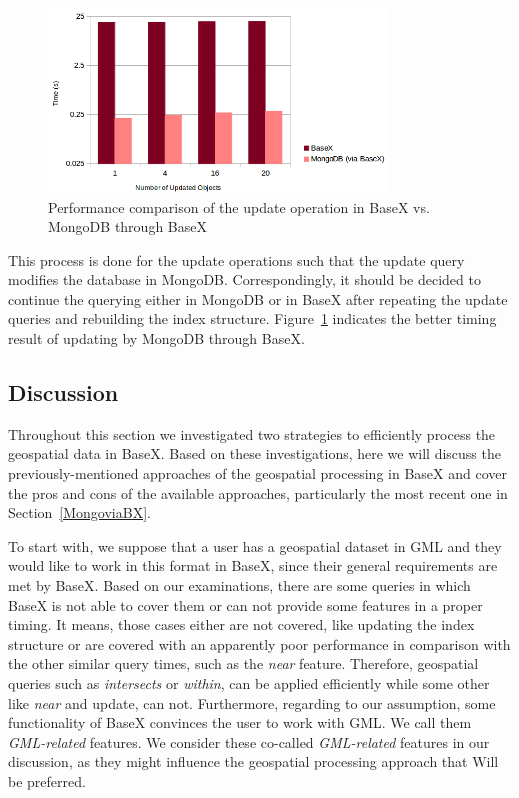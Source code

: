 \documentclass[a4paper,12pt]{article}
\begin{document}
\begin{figure}
\centering
\includegraphics[width=0.8\textwidth]{MongoviaBX-Update-sec-log.png}
\caption{Performance comparison of the update operation in BaseX vs. MongoDB through BaseX}
\label{figMongoviaBX-update}
\end{figure}

This process is done for the update operations such that the update query modifies the database in MongoDB. Correspondingly, it should be decided to continue the querying either in MongoDB or in BaseX after repeating the update queries and rebuilding the index structure. Figure~\ref{figMongoviaBX-update} indicates the better timing result of updating by MongoDB through BaseX. 

\subsection{Discussion}
\label{s.disc}
Throughout this section we investigated two strategies to efficiently process the geospatial data in BaseX. Based on these investigations, here we will discuss the  previously-mentioned approaches of the geospatial processing in BaseX and cover the pros and cons of the available approaches, particularly the most recent one in Section~\ref{MongoviaBX}. 

To start with, we suppose that a user has a geospatial dataset in GML and they would like to work in this format in BaseX, since their general requirements are met by BaseX. Based on our examinations, there are some queries in which BaseX is not able to cover them or can not provide some features in a proper timing. It means, those cases either are not covered, like updating the index structure or are covered with an apparently poor performance in comparison with the other similar query times, such as the \textit{near} feature. Therefore, geospatial queries such as \textit{intersects} or \textit{within}, can be applied efficiently while some other like \textit{near} and update, can not. Furthermore, regarding to our assumption, some functionality of BaseX convinces the user to work with GML. We call them \textit{GML-related} features. We consider these co-called \textit{GML-related} features in our discussion, as they might influence the geospatial processing approach that Will be preferred.
\end{document}
